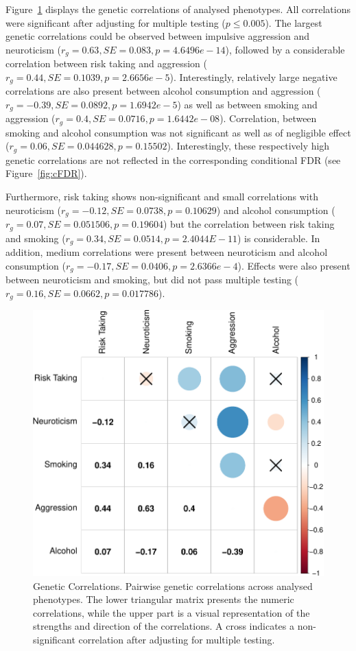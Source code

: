 Figure~\ref{fig:gcor} displays the genetic correlations of analysed phenotypes.
All correlations were significant after adjusting for multiple testing ($p\leq0.005$).
The largest genetic correlations could be observed between impulsive aggression and neuroticism ($r_g=0.63, SE=0.083, p=4.6496e-14$), 
followed by a considerable correlation between risk taking and aggression ($r_g=0.44, SE=0.1039, p=2.6656e-5$).
Interestingly, relatively large negative correlations are also present between alcohol consumption and aggression ($r_g=-0.39, SE=0.0892, p=1.6942e-5$)
as well as between smoking and aggression ($r_g=0.4, SE=0.0716, p=1.6442e-08$).
Correlation, between smoking and alcohol consumption was not significant as well as of negligible effect ($r_g=0.06, SE=0.044628, p=0.15502$).
Interestingly, these respectively high genetic correlations are not reflected in the corresponding conditional FDR (see Figure~\ref{fig:cFDR}).

Furthermore, risk taking shows non-significant and small correlations with neuroticism ($r_g=-0.12, SE=0.0738, p=0.10629$) and
alcohol consumption ($r_g=0.07, SE=0.051506, p=0.19604$) but the correlation between risk taking and smoking ($r_g=0.34, SE=0.0514, p=2.4044E-11$) is considerable.
In addition, medium correlations were present between neuroticism and alcohol consumption ($r_g=-0.17, SE=0.0406, p=2.6366e-4$). 
Effects were also present between neuroticism and smoking, but did not pass multiple testing ($r_g=0.16, SE=0.0662, p=0.017786$).

\begin{figure}[!h]
	\centering
  \includegraphics[width=0.8\linewidth]{figure/genetic_corr/gcorr_plot_circle_full_se.pdf}
  \caption{Genetic Correlations.
    Pairwise genetic correlations across analysed phenotypes.
    The lower triangular matrix presents the numeric correlations, while the upper part is a visual representation of the strengths and direction of the correlations.
    A cross indicates a non-significant correlation after adjusting for multiple testing.
  }\label{fig:gcor}
\end{figure}
